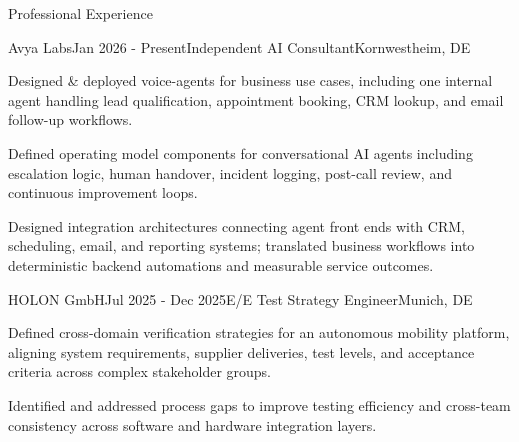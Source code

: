 \documentclass{resume} %
\begin{document}
	\begin{rSection}{Professional Experience}
		\vspace{2mm}
		\begin{rSubsection}{Avya Labs}{Jan 2026 - Present}{Independent AI Consultant}{Kornwestheim, DE}
			\fontsize{10pt}{12pt}\selectfont
			\item Designed \& deployed voice-agents for business use cases, including one internal agent handling lead qualification, appointment booking, CRM lookup, and email follow-up workflows.
			\item Defined operating model components for conversational AI agents including escalation logic, human handover, incident logging, post-call review, and continuous improvement loops.
			\item Designed integration architectures connecting agent front ends with CRM, scheduling, email, and reporting systems; translated business workflows into deterministic backend automations and measurable service outcomes.
		\end{rSubsection}

		\begin{rSubsection}{HOLON GmbH}{Jul 2025 - Dec 2025}{E/E Test Strategy Engineer}{Munich, DE}
			\fontsize{10pt}{12pt}\selectfont
            \item Defined cross-domain verification strategies for an autonomous mobility platform, aligning system requirements, supplier deliveries, test levels, and acceptance criteria across complex stakeholder groups.
			\item Identified and addressed process gaps to improve testing efficiency and cross-team consistency across software and hardware integration layers.
		\end{rSubsection}


\end{rSection}
\end{document}

